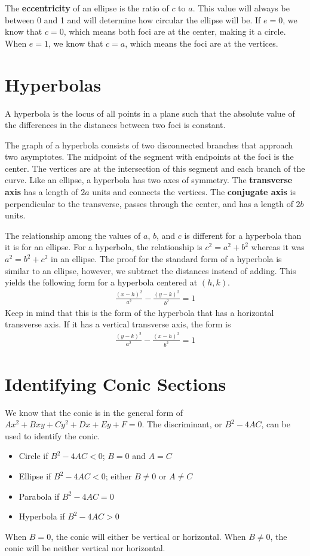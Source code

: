 \documentclass[11pt]{article}
\begin{document}
The \textbf{eccentricity} of an ellipse is the ratio of $c$ to $a$. This value will always be between 0 and 1 and will determine how circular the ellipse will be. If $e = 0$, we know that $c = 0$, which means both foci are at the center, making it a  circle. When $e = 1$, we know that $c = a$, which means the foci are at the vertices.

\section{Hyperbolas}

A hyperbola is the locus of all points in a plane such that the absolute value of the differences in the distances between two foci is constant.  

The graph of a hyperbola consists of two disconnected branches that approach two asymptotes. The midpoint of the segment with endpoints at the foci is the center. The vertices are at the intersection of this segment and each branch of the curve. Like an ellipse, a hyperbola has two axes of symmetry. The \textbf{transverse axis} has a length of $2a$ units and connects the vertices. The \textbf{conjugate axis} is perpendicular to the transverse, passes through the center, and has a length of $2b$ units. 

The relationship among the values of $a$, $b$, and $c$ is different for a hyperbola than it is for an ellipse. For a hyperbola, the relationship is $c^2 = a^2 + b^2$ whereas it was $a^2 = b^2 + c^2$ in an ellipse. The proof for the standard form of a hyperbola is similar to an ellipse, however, we subtract the distances instead of adding. This yields the following form for a hyperbola centered at $(h,k)$.
\begin{align*}
    \frac{(x-h)^2}{a^2} - \frac{(y-k)^2}{b^2} = 1
\end{align*}
Keep in mind that this is the form of the hyperbola that has a horizontal transverse axis. If it has a vertical transverse axis, the form is
\begin{align*}
    \frac{(y-k)^2}{a^2} - \frac{(x-h)^2}{b^2} = 1
\end{align*}

\section{Identifying Conic Sections}

We know that the conic is in the general form of $Ax^2 + Bxy + Cy^2 + Dx + Ey + F = 0$. The discriminant, or $B^2 - 4AC$, can be used to identify the conic.
\begin{itemize}
    \item Circle if $B^2 - 4AC < 0$; $B = 0$ and $A = C$
    \item Ellipse if $B^2 - 4AC < 0$; either $B \neq 0$ or $A \neq C$
    \item Parabola if $B^2 - 4AC = 0$
    \item Hyperbola if $B^2 - 4AC > 0$
\end{itemize}

When $B = 0$, the conic will either be vertical or horizontal. When $B \neq 0$, the conic will be neither vertical nor horizontal.
\end{document}
